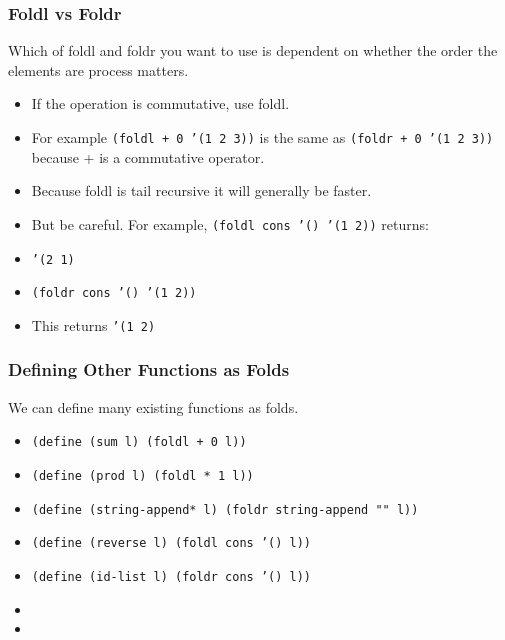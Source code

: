 \documentclass{beamer}
\begin{document}
\begin{frame}
  \frametitle{Foldl vs Foldr}
  Which of foldl and foldr you want to use is dependent on whether the order
  the elements are process matters.
  \begin{itemize}
  \item<2-> If the operation is commutative, use foldl.
  \item<3-> For example \texttt{(foldl + 0 '(1 2 3))}
    is the same as \texttt{(foldr + 0 '(1 2 3))} because +
    is a commutative operator.
  \item<4-> Because foldl is tail recursive it will generally be faster.
  \item<5-> But be careful. For example, \texttt{(foldl cons '() '(1 2))} returns:
  \item<6-> \texttt{'(2 1)}
  \item<7-> \texttt{(foldr cons '() '(1 2))}
  \item<8-> This returns \texttt{'(1 2)}  
  \end{itemize}
\end{frame}



\begin{frame}
  \frametitle{Defining Other Functions as Folds}
  We can define many existing functions as folds.
  \begin{itemize}
  \item<2-> \texttt{(define (sum l) (foldl + 0 l))}
  \item<3-> \texttt{(define (prod l) (foldl * 1 l))}
  \item<4-> \texttt{(define (string-append*  l) (foldr string-append "" l))}
  \item<5-> \texttt{(define (reverse l) (foldl cons '() l))}
  \item<6-> \texttt{(define (id-list l) (foldr cons '() l))}
  \item<7-> \foldMap
  \item<8-> \foldFilter
  \end{itemize}
\end{frame}
\end{document}
